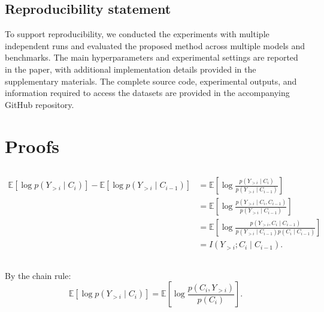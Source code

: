 \documentclass{article} %
\begin{document}
\subsection*{Reproducibility statement}
To support reproducibility, we conducted the experiments with multiple independent
runs and evaluated the proposed method across multiple models and benchmarks.
The main hyperparameters and experimental settings are reported in the paper,
with additional implementation details provided in the supplementary materials.
The complete source code, experimental outputs, and information required to
access the datasets are provided in the accompanying GitHub repository.




\appendix
\section{Proofs}

\subsection{}
\label{subsec:proof_evidence_quality}

\[
\begin{aligned}
\mathbb{E}\!\left[\log p\!\left(Y_{>i} \mid C_i\right)\right]
-
\mathbb{E}\!\left[\log p\!\left(Y_{>i} \mid C_{i-1}\right)\right]
&=
\mathbb{E}\!\left[
\log
\frac{p\!\left(Y_{>i} \mid C_i\right)}
     {p\!\left(Y_{>i} \mid C_{i-1}\right)}
\right] \\[4pt]
&=
\mathbb{E}\!\left[
\log
\frac{p\!\left(Y_{>i} \mid C_i,C_{i-1}\right)}
     {p\!\left(Y_{>i} \mid C_{i-1}\right)}
\right] \\[4pt]
&=
\mathbb{E}\!\left[
\log
\frac{
p\!\left(Y_{>i},C_i \mid C_{i-1}\right)
}{
p\!\left(Y_{>i} \mid C_{i-1}\right)
p\!\left(C_i \mid C_{i-1}\right)
}
\right] \\[4pt]
&=
I\!\left(Y_{>i};C_i \mid C_{i-1}\right).
\end{aligned}
\]


\subsection{}
\label{subsec:proof_drift_rate_requation_2}

By the chain rule:
\[
\mathbb{E}
\left[
\log p(Y_{>i}\mid C_i)
\right]
=
\mathbb{E}
\left[
\log
\frac{p(C_i,Y_{>i})}{p(C_i)}
\right].
\]
\end{document}
